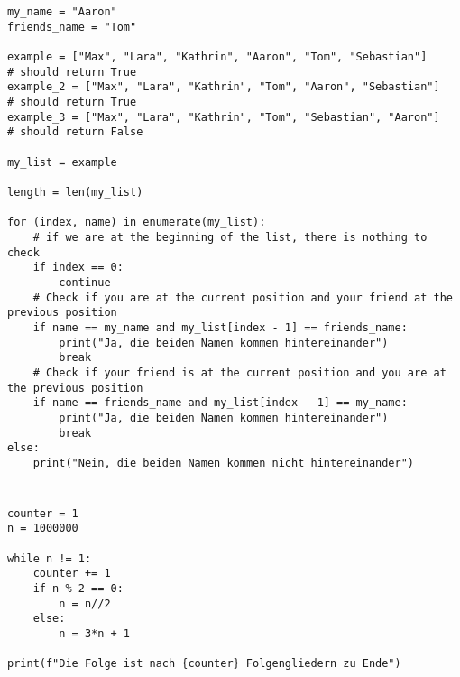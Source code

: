 \documentclass[a4paper]{article}
\begin{document}
\section{} 
\begin{verbatim}
my_name = "Aaron"
friends_name = "Tom"

example = ["Max", "Lara", "Kathrin", "Aaron", "Tom", "Sebastian"]     # should return True
example_2 = ["Max", "Lara", "Kathrin", "Tom", "Aaron", "Sebastian"]   # should return True
example_3 = ["Max", "Lara", "Kathrin", "Tom", "Sebastian", "Aaron"]   # should return False

my_list = example

length = len(my_list)

for (index, name) in enumerate(my_list):
    # if we are at the beginning of the list, there is nothing to check
    if index == 0:
        continue
    # Check if you are at the current position and your friend at the previous position
    if name == my_name and my_list[index - 1] == friends_name:
        print("Ja, die beiden Namen kommen hintereinander")
        break
    # Check if your friend is at the current position and you are at the previous position
    if name == friends_name and my_list[index - 1] == my_name:
        print("Ja, die beiden Namen kommen hintereinander")
        break
else:
    print("Nein, die beiden Namen kommen nicht hintereinander")
\end{verbatim}

\section{}
\begin{verbatim}
counter = 1
n = 1000000

while n != 1:
    counter += 1
    if n % 2 == 0:
        n = n//2
    else:
        n = 3*n + 1

print(f"Die Folge ist nach {counter} Folgengliedern zu Ende")
\end{verbatim}
\end{document}
